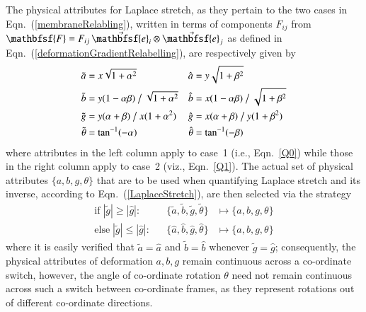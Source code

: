 The physical attributes for Laplace stretch, as they pertain to the two cases in Eqn.~(\ref{membraneRelabling}), written in terms of components $F_{ij}$ from $\mathbfsf{F} = F_{ij} \, \vec{\mathbfsf{e}}_i \otimes \vec{\mathbfsf{e}}_j$ as defined in Eqn.~(\ref{deformationGradientRelabelling}), are respectively given by
\begin{subequations}
	\label{physicalAttributes}
	\begin{align}
	\tilde{a} & = x \sqrt{1 + \alpha^2} & 
	\hat{a} & = y \sqrt{1 + \beta^2} 
	\label{aAttribute} \\
	\tilde{b} & = y ( 1 - \alpha \beta ) \bigm/ \sqrt{1 + \alpha^2} &
	\hat{b} & = x ( 1 - \alpha \beta ) \bigm/ \sqrt{1 + \beta^2} 
	\label{bAttribute} \\ 
	\tilde{g} & = y ( \alpha + \beta ) \bigm/ x (1 + \alpha^2) &
	\hat{g} & = x ( \alpha + \beta ) \bigm/ y (1 + \beta^2)
	\label{gAttribute} \\
	\tilde{\theta} & = \tan^{-1} ( -\alpha ) & 
	\hat{\theta} & = \tan^{-1} ( -\beta )
	\label{thetaAttribute}
	\end{align}
\end{subequations}
where attributes in the left column apply to case~1 (i.e., Eqn.~\ref{Q0}) while those in the right column apply to case~2 (viz., Eqn.~\ref{Q1}).  The actual set of physical attributes $\{ a, b, g, \theta \}$ that are to be used when quantifying Laplace stretch and its inverse, according to Eqn.~(\ref{LaplaceStretch}), are then selected via the strategy  
\begin{subequations}
	\label{attributeMaps}
	\begin{align}
	\mathrm{if} \; | \tilde{g} | \geq | \hat{g} | : & &
	\{ \tilde{a} , \tilde{b} , \tilde{g} , \tilde{\theta} \} &
	\mapsto \{ a , b , g , \theta \}  \\
	\mathrm{else} \; | \tilde{g} | \leq | \hat{g} | : & &
	\{ \hat{a} , \hat{b} , \hat{g} , \hat{\theta} \} & 
	\mapsto \{ a , b , g , \theta \}
	\end{align}
\end{subequations}
where it is easily verified that $\tilde{a} = \hat{a}$ and $\tilde{b} = \hat{b}$ whenever $\tilde{g} = \hat{g}$; consequently, the physical attributes of deformation $a , b , g$ remain continuous across a co-ordinate switch, however, the angle of co-ordinate rotation $\theta$ need not remain continuous across such a switch between co-ordinate frames, as they represent rotations out of different co-ordinate directions.


